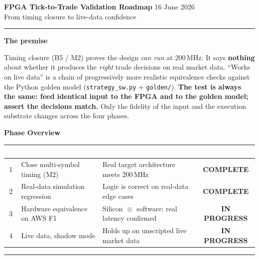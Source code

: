 \documentclass[10pt,a4paper]{article}
\newcommand{\done}{\textcolor{okgreen}{\textbf{COMPLETE}}}
\newcommand{\inprog}{\textcolor{warnamber}{\textbf{IN PROGRESS}}}
\newcommand{\sectionrule}{\vspace{2pt}\textcolor{rulegray}{\rule{\linewidth}{0.8pt}}\vspace{2pt}}
\begin{document}
{\LARGE\bfseries\color{hdrblue} FPGA Tick-to-Trade \textendash{} Validation Roadmap}%
\hfill{\small\color{rulegray} 16 June 2026}\\[-2pt]
{\large\color{accentteal} From timing closure to live-data confidence}

\textcolor{hdrblue}{\rule{\linewidth}{2pt}}

\begin{keybox}
{\large\bfseries\color{newtext} The premise}

\smallskip
Timing closure (B5 / M2) proves the design \emph{can run} at 200\,MHz. It says
\textbf{nothing} about whether it produces the \emph{right} trade decisions on
real market data. ``Works on live data'' is a chain of progressively more
realistic equivalence checks against the Python golden model
(\texttt{strategy\_sw.py} + \texttt{golden/}). \textbf{The test is always the
same: feed identical input to the FPGA and to the golden model; assert the
decisions match.} Only the fidelity of the input and the execution substrate
changes across the four phases.
\end{keybox}

{\large\bfseries\color{hdrblue} Phase Overview}

\vspace{4pt}
\begin{center}
\renewcommand{\arraystretch}{1.35}
\begin{tabular}{@{}c l l c@{}}
\toprule
\rowcolor{hdrblue}
\textcolor{white}{\textbf{\#}} &
\textcolor{white}{\textbf{Phase}} &
\textcolor{white}{\textbf{What it proves}} &
\textcolor{white}{\textbf{Status}} \\
\midrule
\rowcolor{passrowbg}
1 & Close multi-symbol timing (M2) & Real target architecture meets 200\,MHz & \done \\
\rowcolor{passrowbg}
2 & Real-data simulation regression & Logic is correct on real-data edge cases & \done \\
\rowcolor{pendrowbg}
3 & Hardware equivalence on AWS F1 & Silicon $\equiv$ software; real latency confirmed & \inprog \\
\rowcolor{pendrowbg}
4 & Live data, shadow mode & Holds up on unscripted live market data & \inprog \\
\bottomrule
\end{tabular}
\end{center}

\sectionrule
\end{document}
